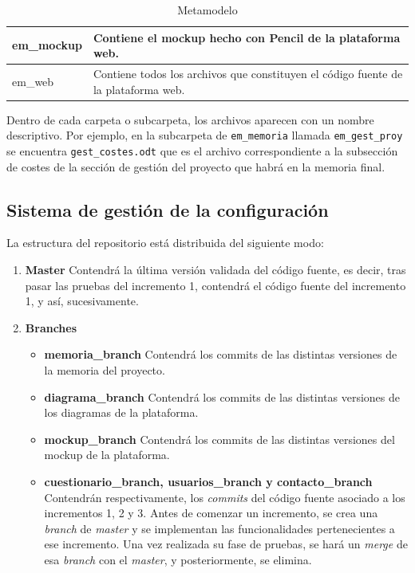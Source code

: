 \begin{table}[htpb]
\begin{tabularx}{\textwidth}{|l|l|X|}
\multicolumn{2}{|X|}{em\_mockup}                  & Contiene el mockup hecho con Pencil de la plataforma web.                                                                  \\ \hline
\multicolumn{2}{|X|}{em\_web}                     & Contiene todos los archivos que constituyen el código fuente de la plataforma web.                                         \\ \hline
\end{tabularx}
\caption{Metamodelo}
\label{tab_metamodelo}
\end{table}

Dentro de cada carpeta o subcarpeta, los archivos aparecen con un nombre descriptivo. Por ejemplo, en la subcarpeta de \texttt{em\_memoria} llamada \texttt{em\_gest\_proy} se encuentra \texttt{gest\_costes.odt} que es el archivo correspondiente a la subsección de costes de la sección de gestión del proyecto que habrá en la memoria final.

\subsection{Sistema de gestión de la configuración}
La estructura del repositorio está distribuida del siguiente modo:

\begin{enumerate}
\item \textbf{Master}
Contendrá la última versión validada del código fuente, es decir, tras pasar las pruebas del incremento 1, contendrá el código fuente del incremento 1, y así, sucesivamente.
\item \textbf{Branches}
	\begin{itemize}
	\item \textbf{memoria\_branch}
	Contendrá los commits de las distintas versiones de la memoria del proyecto.
	\item \textbf{diagrama\_branch}
	Contendrá los commits de las distintas versiones de los diagramas de la plataforma.
	\item \textbf{mockup\_branch}
	Contendrá los commits de las distintas versiones del mockup de la plataforma.
	\item \textbf{cuestionario\_branch, usuarios\_branch y contacto\_branch}
	Contendrán respectivamente, los \textit{commits} del código fuente asociado a los incrementos 1, 2 y 3.
	Antes de comenzar un incremento, se crea una \textit{branch} de \textit{master} y se implementan las funcionalidades pertenecientes a ese incremento. Una vez realizada su fase de pruebas, se hará un \textit{merge} de esa \textit{branch} con el \textit{master}, y posteriormente, se elimina.
	\end{itemize}
\end{enumerate}


